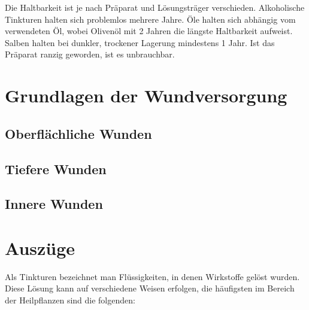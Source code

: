 Die Haltbarkeit ist je nach Präparat und Lösungsträger verschieden. Alkoholische Tinkturen halten sich problemlos mehrere Jahre. Öle halten sich abhängig vom verwendeten Öl, wobei Olivenöl mit 2 Jahren die längste Haltbarkeit aufweist. Salben halten bei dunkler, trockener Lagerung mindestens 1 Jahr. Ist das Präparat ranzig geworden, ist es unbrauchbar.




\section{Grundlagen der Wundversorgung}
\label{   }




\subsection{Oberflächliche Wunden}
\label{   }



\subsection{Tiefere Wunden}
\label{   }



\subsection{Innere Wunden}
\label{   }




\section{Auszüge}
\label{   }


Als Tinkturen bezeichnet man Flüssigkeiten, in denen Wirkstoffe gelöst wurden. Diese Lösung kann auf verschiedene Weisen erfolgen, die häufigsten im Bereich der Heilpflanzen sind die folgenden:

